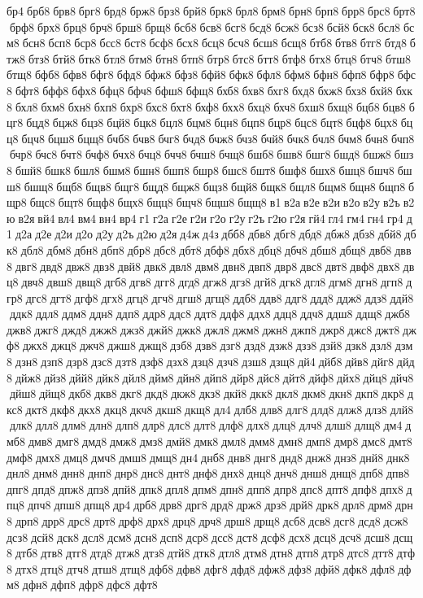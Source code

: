 бр4 брб8 брв8 брг8 брд8 брж8 брз8 брй8 брк8 брл8 брм8 брн8 брп8 брр8 брс8 брт8 брф8 брх8 брц8 брч8 брш8 брщ8 бсб8 бсв8 бсг8 бсд8 бсж8 бсз8 бсй8 бск8 бсл8 бсм8 бсн8 бсп8 бср8 бсс8 бст8 бсф8 бсх8 бсц8 бсч8 бсш8 бсщ8 бтб8 бтв8 бтг8 бтд8 бтж8 бтз8 бтй8 бтк8 бтл8 бтм8 бтн8 бтп8 бтр8 бтс8 бтт8 бтф8 бтх8 бтц8 бтч8 бтш8 бтщ8 бфб8 бфв8 бфг8 бфд8 бфж8 бфз8 бфй8 бфк8 бфл8 бфм8 бфн8 бфп8 бфр8 бфс8 бфт8 бфф8 бфх8 бфц8 бфч8 бфш8 бфщ8 бхб8 бхв8 бхг8 бхд8 бхж8 бхз8 бхй8 бхк8 бхл8 бхм8 бхн8 бхп8 бхр8 бхс8 бхт8 бхф8 бхх8 бхц8 бхч8 бхш8 бхщ8 бцб8 бцв8 бцг8 бцд8 бцж8 бцз8 бцй8 бцк8 бцл8 бцм8 бцн8 бцп8 бцр8 бцс8 бцт8 бцф8 бцх8 бцц8 бцч8 бцш8 бцщ8 бчб8 бчв8 бчг8 бчд8 бчж8 бчз8 бчй8 бчк8 бчл8 бчм8 бчн8 бчп8 бчр8 бчс8 бчт8 бчф8 бчх8 бчц8 бчч8 бчш8 бчщ8 бшб8 бшв8 бшг8 бшд8 бшж8 бшз8 бшй8 бшк8 бшл8 бшм8 бшн8 бшп8 бшр8 бшс8 бшт8 бшф8 бшх8 бшц8 бшч8 бшш8 бшщ8 бщб8 бщв8 бщг8 бщд8 бщж8 бщз8 бщй8 бщк8 бщл8 бщм8 бщн8 бщп8 бщр8 бщс8 бщт8 бщф8 бщх8 бщц8 бщч8 бщш8 бщщ8 в1 в2а в2е в2и в2о в2у в2ъ в2ю в2я вй4 вл4 вм4 вн4 вр4 г1 г2а г2е г2и г2о г2у г2ъ г2ю г2я гй4 гл4 гм4 гн4 гр4 д1 д2а д2е д2и д2о д2у д2ъ д2ю д2я д4ж д4з дбб8 дбв8 дбг8 дбд8 дбж8 дбз8 дбй8 дбк8 дбл8 дбм8 дбн8 дбп8 дбр8 дбс8 дбт8 дбф8 дбх8 дбц8 дбч8 дбш8 дбщ8 двб8 двв8 двг8 двд8 двж8 двз8 двй8 двк8 двл8 двм8 двн8 двп8 двр8 двс8 двт8 двф8 двх8 двц8 двч8 двш8 двщ8 дгб8 дгв8 дгг8 дгд8 дгж8 дгз8 дгй8 дгк8 дгл8 дгм8 дгн8 дгп8 дгр8 дгс8 дгт8 дгф8 дгх8 дгц8 дгч8 дгш8 дгщ8 ддб8 ддв8 ддг8 ддд8 ддж8 ддз8 ддй8 ддк8 ддл8 ддм8 ддн8 ддп8 ддр8 ддс8 ддт8 ддф8 ддх8 ддц8 ддч8 ддш8 ддщ8 джб8 джв8 джг8 джд8 джж8 джз8 джй8 джк8 джл8 джм8 джн8 джп8 джр8 джс8 джт8 джф8 джх8 джц8 джч8 джш8 джщ8 дзб8 дзв8 дзг8 дзд8 дзж8 дзз8 дзй8 дзк8 дзл8 дзм8 дзн8 дзп8 дзр8 дзс8 дзт8 дзф8 дзх8 дзц8 дзч8 дзш8 дзщ8 дй4 дйб8 дйв8 дйг8 дйд8 дйж8 дйз8 дйй8 дйк8 дйл8 дйм8 дйн8 дйп8 дйр8 дйс8 дйт8 дйф8 дйх8 дйц8 дйч8 дйш8 дйщ8 дкб8 дкв8 дкг8 дкд8 дкж8 дкз8 дкй8 дкк8 дкл8 дкм8 дкн8 дкп8 дкр8 дкс8 дкт8 дкф8 дкх8 дкц8 дкч8 дкш8 дкщ8 дл4 длб8 длв8 длг8 длд8 длж8 длз8 длй8 длк8 длл8 длм8 длн8 длп8 длр8 длс8 длт8 длф8 длх8 длц8 длч8 длш8 длщ8 дм4 дмб8 дмв8 дмг8 дмд8 дмж8 дмз8 дмй8 дмк8 дмл8 дмм8 дмн8 дмп8 дмр8 дмс8 дмт8 дмф8 дмх8 дмц8 дмч8 дмш8 дмщ8 дн4 днб8 днв8 днг8 днд8 днж8 днз8 днй8 днк8 днл8 днм8 днн8 днп8 днр8 днс8 днт8 днф8 днх8 днц8 днч8 днш8 днщ8 дпб8 дпв8 дпг8 дпд8 дпж8 дпз8 дпй8 дпк8 дпл8 дпм8 дпн8 дпп8 дпр8 дпс8 дпт8 дпф8 дпх8 дпц8 дпч8 дпш8 дпщ8 др4 дрб8 дрв8 дрг8 дрд8 држ8 дрз8 дрй8 дрк8 дрл8 дрм8 дрн8 дрп8 дрр8 дрс8 дрт8 дрф8 дрх8 дрц8 дрч8 дрш8 дрщ8 дсб8 дсв8 дсг8 дсд8 дсж8 дсз8 дсй8 дск8 дсл8 дсм8 дсн8 дсп8 дср8 дсс8 дст8 дсф8 дсх8 дсц8 дсч8 дсш8 дсщ8 дтб8 дтв8 дтг8 дтд8 дтж8 дтз8 дтй8 дтк8 дтл8 дтм8 дтн8 дтп8 дтр8 дтс8 дтт8 дтф8 дтх8 дтц8 дтч8 дтш8 дтщ8 дфб8 дфв8 дфг8 дфд8 дфж8 дфз8 дфй8 дфк8 дфл8 дфм8 дфн8 дфп8 дфр8 дфс8 дфт8 
